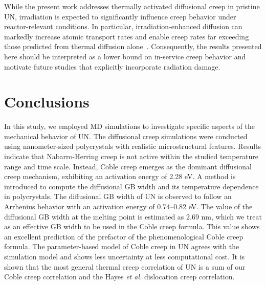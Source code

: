 \documentclass[preprint,12pt,sort&compress]{elsarticle}
\newcommand{\?}{\stackrel{?}{=}}
\begin{document}
While the present work addresses thermally activated diffusional creep in pristine UN, irradiation is expected to significantly influence creep behavior under reactor-relevant conditions. In particular, irradiation-enhanced diffusion can markedly increase atomic transport rates and enable creep rates far exceeding those predicted from thermal diffusion alone~\cite{Cooper2021}. Consequently, the results presented here should be interpreted as a lower bound on in-service creep behavior and motivate future studies that explicitly incorporate radiation damage.


\FloatBarrier

\section{Conclusions}

In this study, we employed MD simulations to investigate specific aspects of the mechanical behavior of UN. The diffusional creep simulations were conducted using nanometer-sized polycrystals with realistic microstructural features. Results indicate that Nabarro-Herring creep is not active within the studied temperature range and time scale. Instead, Coble creep emerges as the dominant diffusional creep mechanism, exhibiting an activation energy of 2.28 eV. A method is introduced to compute the diffusional GB width and its temperature dependence in polycrystals. The diffusional GB width of UN is observed to follow an Arrhenius behavior with an activation energy of 0.74--0.82 eV. The value of the diffusional GB width at the melting point is estimated as 2.69 nm, which we treat as an effective GB width to be used in the Coble creep formula. This value shows an excellent prediction of the prefactor of the phenomenological Coble creep formula. The parameter-based model of Coble creep in UN agrees with the simulation model and shows less uncertainty at less computational cost. It is shown that the most general thermal creep correlation of UN is a sum of our Coble creep correlation and the Hayes \textit{et al.} dislocation creep correlation.
\end{document}

